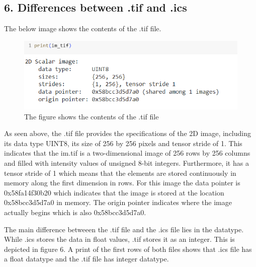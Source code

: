 \documentclass{article}
\begin{document}
\subsection*{6. Differences between .tif and .ics}
The below image shows the contents of the .tif file.
\begin{figure}[h!]
\centering
\includegraphics[width=0.8\linewidth]{Report/Images/tif_header_image.png}
\caption{\label{fig:tif_image}The figure shows the contents of the .tif file}
\end{figure}

As seen above, the .tif file provides the specifications of the 2D image, including its data type UINT8, its size of 256 by 256 pixels and tensor stride of 1. This indicates that the im.tif is a two-dimensional image of 256 rows by 256 columns and filled with intensity values of unsigned 8-bit integers. Furthermore, it has a tensor stride of 1 which means that the elements are stored continuously in memory along the first dimension in rows.  For this image the data pointer is 0x58fa14f30b20 which indicates that the image is stored at the location 0x58bcc3d5d7a0 in memory. The origin pointer indicates where the image actually begins which is also 0x58bcc3d5d7a0.

The main difference betweeen the .tif file and the .ics file lies in the datatype. While .ics stores the data in float values, .tif stores it as an integer. This is depicted in figure 6. A print of the first rows of both files shows that .ics file has a float datatype and the .tif file has integer datatype.  
\end{document}
